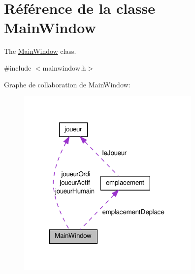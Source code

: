 \hypertarget{class_main_window}{\section{Référence de la classe Main\-Window}
\label{class_main_window}
}


The \hyperlink{class_main_window}{Main\-Window} class.  




{\ttfamily \#include $<$mainwindow.\-h$>$}



Graphe de collaboration de Main\-Window\-:\nopagebreak
\begin{figure}[H]
\begin{center}
\leavevmode
\includegraphics[width=255pt]{class_main_window__coll__graph}
\end{center}
\end{figure}
